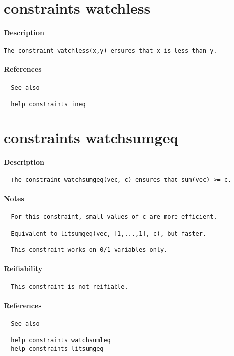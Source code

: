 \section{constraints watchless}
\paragraph{Description}
{\footnotesize
\begin{verbatim}
The constraint watchless(x,y) ensures that x is less than y.
\end{verbatim}
}
\paragraph{References}
{\footnotesize
\begin{verbatim}
  See also

  help constraints ineq
\end{verbatim}
}
\section{constraints watchsumgeq}
\paragraph{Description}
{\footnotesize
\begin{verbatim}
  The constraint watchsumgeq(vec, c) ensures that sum(vec) >= c.
\end{verbatim}
}
\paragraph{Notes}
{\footnotesize
\begin{verbatim}
  For this constraint, small values of c are more efficient.

  Equivalent to litsumgeq(vec, [1,...,1], c), but faster.

  This constraint works on 0/1 variables only.
\end{verbatim}
}
\paragraph{Reifiability}
{\footnotesize
\begin{verbatim}
  This constraint is not reifiable.
\end{verbatim}
}
\paragraph{References}
{\footnotesize
\begin{verbatim}
  See also

  help constraints watchsumleq 
  help constraints litsumgeq
\end{verbatim}
}
